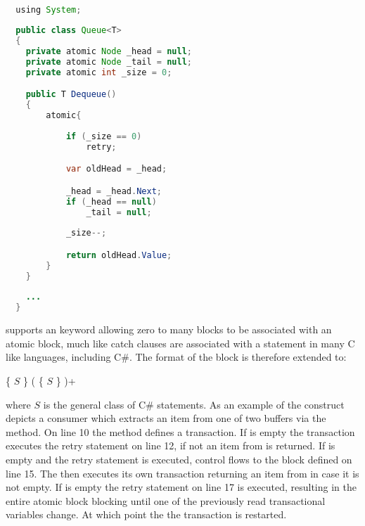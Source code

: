 \begin{lstlisting}[label=lst:stm_atomic_syntax_retry,
  caption={Retry Syntax},
  language=Java,  
  showspaces=false,
  showtabs=false,
  breaklines=true,
  showstringspaces=false,
  breakatwhitespace=true,
  commentstyle=\color{greencomments},
  keywordstyle=\color{bluekeywords},
  stringstyle=\color{redstrings},
  morekeywords={atomic, retry, orElse, var, get, set, using}]  % Start your code-block

  using System;
  
  public class Queue<T>
  {
  	private atomic Node _head = null;
  	private atomic Node _tail = null;
  	private atomic int _size = 0;

  	public T Dequeue()
  	{
  		atomic{
  		
  			if (_size == 0)
  				retry;

  			var oldHead = _head;

  			_head = _head.Next;
  			if (_head == null)
  				_tail = null;
  			
  			_size--;

  			return oldHead.Value;
  		}
  	}
  	
  	...
  }
\end{lstlisting}

\stmnamesp supports an  keyword allowing zero to many  blocks to be associated with an atomic block, much like catch clauses are associated with a  statement in many C like languages, including C\#\cite[p. 96]{sestoft2011c}. The  format of the  block is therefore extended to:

 \{ $S$ \} (  \{ $S$ \} )+

where $S$ is the general class of C\# statements. As an example of the  construct   depicts a consumer which extracts an item from one of two buffers via the  method. On line 10 the  method defines a transaction. If  is empty the transaction executes the retry statement on line 12, if not an item from  is returned. If  is empty and the retry statement is executed, control flows to the  block defined on line 15. The  then executes its own transaction returning an item from  in case it is not empty. If  is empty the retry statement on line 17 is executed, resulting in the entire atomic block blocking until one of the previously read transactional variables change. At which point the the transaction is restarted.


